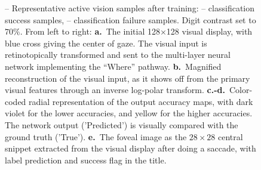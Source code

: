\begin{figure}[t!]
	\caption{
		{\A-- \E Representative active vision samples after training}: \A-- \B classification success samples, \C-- \E classification failure samples. Digit contrast set to $70\%$. From left to right: {\bf a.}~The initial 128$\times$128 visual display, with blue cross giving the center of gaze.
		The visual input is retinotopically transformed and sent to the multi-layer neural network implementing the ``Where'' pathway.
		{\bf b.}~Magnified reconstruction of the visual input, as it shows off from the primary visual features through an inverse log-polar transform.
		{\bf c.-d.}~Color-coded radial representation of the output accuracy maps, with dark violet for the lower accuracies, and yellow for the higher accuracies. The network output ('Predicted') is visually compared with the ground truth ('True'). %
		{\bf e.}~The foveal image as the $28 \times 28$ central snippet extracted from the visual display after doing a saccade, with label prediction and success flag in the title.
		\label{fig:saccades}}%
\end{figure}%

